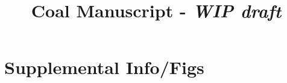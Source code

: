 \documentclass{article}
\title{Coal Manuscript - \textit{WIP draft}}
\author{}
\date{}
\begin{document}
\maketitle



%  

















\section{Supplemental Info/Figs}
\end{document}
